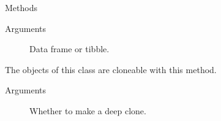 \documentclass[a4paper]{book}
\begin{document}
\begin{Section}{Methods}
\begin{SubSection}{}
\begin{SubSubSection}{Arguments}
\begin{description}

\item[] Data frame or tibble.

\end{description}



\end{SubSubSection}

\end{SubSection}




\hypertarget{method-VolumeModel-clone}{}
%
\begin{SubSection}{}
The objects of this class are cloneable with this method.
%

%
\begin{SubSubSection}{Arguments}

\begin{description}

\item[] Whether to make a deep clone.

\end{description}



\end{SubSubSection}

\end{SubSection}


\end{Section}
\printindex{}
\end{document}
